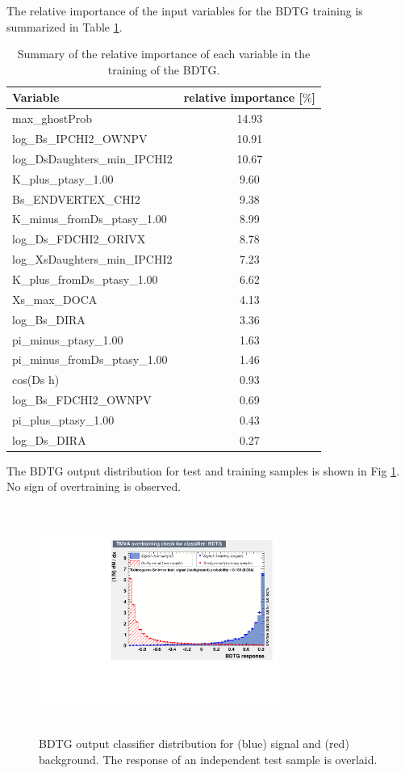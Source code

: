 The relative importance of the input variables for the BDTG training is summarized in Table \ref{table:InputVars}.

\begin{table}[h]
\centering
 \begin{tabular}{l c}
Variable & relative importance [$\%$]\\
  \hline
max\_ghostProb & 14.93\\
log\_Bs\_IPCHI2\_OWNPV & 10.91\\
log\_DsDaughters\_min\_IPCHI2 & 10.67\\
K\_plus\_ptasy\_1.00 & 9.60\\
Bs\_ENDVERTEX\_CHI2 & 9.38\\
K\_minus\_fromDs\_ptasy\_1.00 & 8.99\\
log\_Ds\_FDCHI2\_ORIVX & 8.78\\
log\_XsDaughters\_min\_IPCHI2 & 7.23\\
K\_plus\_fromDs\_ptasy\_1.00 & 6.62\\
Xs\_max\_DOCA & 4.13\\
log\_Bs\_DIRA & 3.36\\
pi\_minus\_ptasy\_1.00 & 1.63\\
pi\_minus\_fromDs\_ptasy\_1.00 & 1.46\\
cos(Ds h) & 0.93\\
log\_Bs\_FDCHI2\_OWNPV & 0.69\\
pi\_plus\_ptasy\_1.00 & 0.43\\
log\_Ds\_DIRA & 0.27\\
\end{tabular}
\caption{Summary of the relative importance of each variable in the training of the BDTG.}
\label{table:InputVars}
\end{table}

 
The BDTG output distribution for test and training samples is shown in Fig \ref{fig:BDT_Response}. No sign of overtraining is observed. 

\begin{figure}[h]
\includegraphics[height=7.4cm,width=0.7\textwidth]{figs/BDT_Response.pdf}
\caption{BDTG output classifier distribution for (blue) signal and (red) background. The response of an independent test sample is overlaid.}
\label{fig:BDT_Response}
\end{figure}

